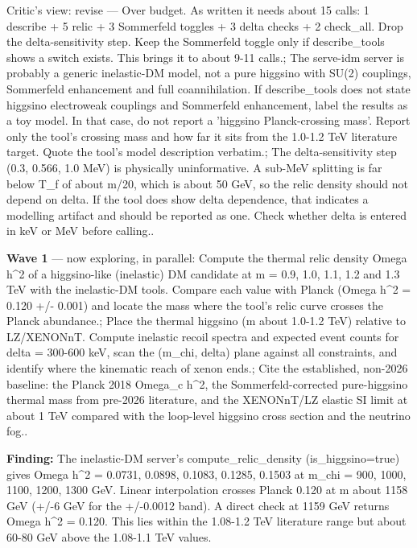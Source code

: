 \documentclass[11pt,a4paper]{article}
\begin{document}
\begin{enumerate}
Critic's view: revise --- Over budget. As written it needs about 15 calls: 1 describe + 5 relic + 3 Sommerfeld toggles + 3 delta checks + 2 check\_all. Drop the delta-sensitivity step. Keep the Sommerfeld toggle only if describe\_tools shows a switch exists. This brings it to about 9-11 calls.; The serve-idm server is probably a generic inelastic-DM model, not a pure higgsino with SU(2) couplings, Sommerfeld enhancement and full coannihilation. If describe\_tools does not state higgsino electroweak couplings and Sommerfeld enhancement, label the results as a toy model. In that case, do not report a 'higgsino Planck-crossing mass'. Report only the tool's crossing mass and how far it sits from the 1.0-1.2 TeV literature target. Quote the tool's model description verbatim.; The delta-sensitivity step (0.3, 0.566, 1.0 MeV) is physically uninformative. A sub-MeV splitting is far below T\_f of about m/20, which is about 50 GeV, so the relic density should not depend on delta. If the tool does show delta dependence, that indicates a modelling artifact and should be reported as one. Check whether delta is entered in keV or MeV before calling..

\end{enumerate}
\textbf{Wave 1} --- now exploring, in parallel: Compute the thermal relic density Omega h\textasciicircum{}2 of a higgsino-like (inelastic) DM candidate at m = 0.9, 1.0, 1.1, 1.2 and 1.3 TeV with the inelastic-DM tools. Compare each value with Planck (Omega h\textasciicircum{}2 = 0.120 +/- 0.001) and locate the mass where the tool's relic curve crosses the Planck abundance.; Place the thermal higgsino (m about 1.0-1.2 TeV) relative to LZ/XENONnT. Compute inelastic recoil spectra and expected event counts for delta = 300-600 keV, scan the (m\_chi, delta) plane against all constraints, and identify where the kinematic reach of xenon ends.; Cite the established, non-2026 baseline: the Planck 2018 Omega\_c h\textasciicircum{}2, the Sommerfeld-corrected pure-higgsino thermal mass from pre-2026 literature, and the XENONnT/LZ elastic SI limit at about 1 TeV compared with the loop-level higgsino cross section and the neutrino fog..

\textbf{Finding:} The inelastic-DM server's compute\_relic\_density (is\_higgsino=true) gives Omega h\textasciicircum{}2 = 0.0731, 0.0898, 0.1083, 0.1285, 0.1503 at m\_chi = 900, 1000, 1100, 1200, 1300 GeV. Linear interpolation crosses Planck 0.120 at m about 1158 GeV (+/-6 GeV for the +/-0.0012 band). A direct check at 1159 GeV returns Omega h\textasciicircum{}2 = 0.120. This lies within the 1.08-1.2 TeV literature range but about 60-80 GeV above the 1.08-1.1 TeV values.
\end{document}
